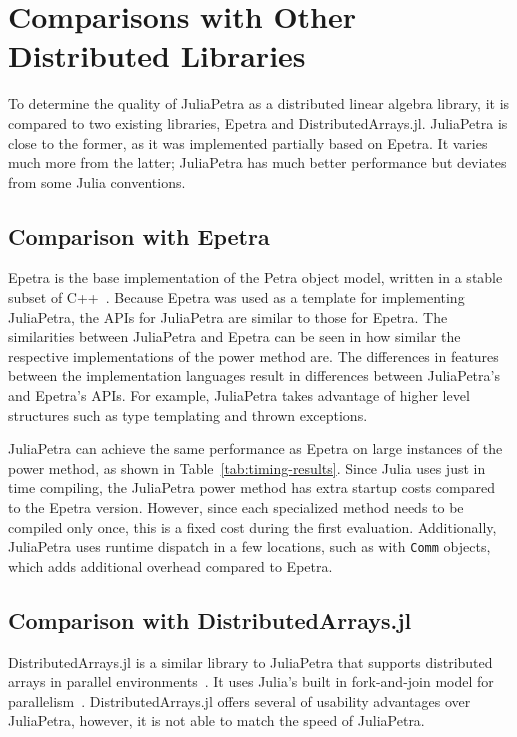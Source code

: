 \documentclass[acmsmall]{acmart}
\newcommand{\snippet}[1]{\lstinline{#1}}
\begin{document}
	\section{Comparisons with Other Distributed Libraries}
	
	To determine the quality of JuliaPetra as a distributed linear algebra library, it is compared to two existing libraries, Epetra and DistributedArrays.jl.
	JuliaPetra is close to the former, as it was implemented partially based on Epetra.
	It varies much more from the latter; JuliaPetra has much better performance but deviates from some Julia conventions.
	
	\subsection{Comparison with Epetra}
	
	Epetra is the base implementation of the Petra object model,
	written in a stable subset of C++~\cite{Heroux:2005:Trilinos}.
	Because Epetra was used as a template for implementing JuliaPetra,
	the APIs for JuliaPetra are similar to those for Epetra.
	The similarities between JuliaPetra and Epetra can be seen in how similar the respective implementations
	of the power method are.
	The differences in features between the implementation languages result in differences
	between JuliaPetra's and Epetra's APIs.
	For example, JuliaPetra takes advantage of higher level structures
	such as type templating and thrown exceptions.
	
	JuliaPetra can achieve the same performance as Epetra on large instances of the power method, as shown in Table~\ref{tab:timing-results}.
	Since Julia uses just in time compiling, the JuliaPetra power method has extra startup costs compared to
	the Epetra version. However, since each specialized method needs to be compiled only once,
	this is a fixed cost during the first evaluation.
	Additionally, JuliaPetra uses runtime dispatch in a few locations, such as with
	\snippet{Comm} objects, which adds additional overhead compared to Epetra.
	
	\subsection{Comparison with DistributedArrays.jl}
	
	DistributedArrays.jl is a similar library to JuliaPetra that supports
	distributed arrays in parallel environments~\cite{Github:DA}.
	It uses Julia's built in fork-and-join model for parallelism~\cite{Bezanson:2017:FreshApproach}.
	DistributedArrays.jl offers several of usability advantages over JuliaPetra, however, it is not able to match the speed of JuliaPetra.
	
\end{document}
